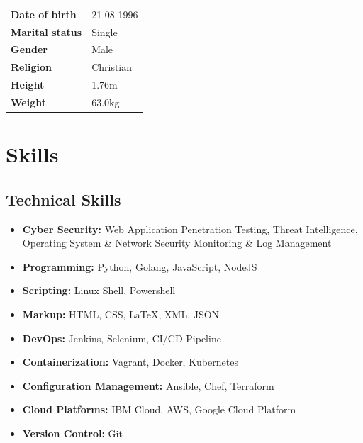 \documentclass[11pt,a4paper]{moderncv}
\begin{document}
\begin{tabular}{p{4cm}l}
\textbf{Date of birth}         &   21-08-1996 \\ 
\textbf{Marital status}        &   Single    \\ 
\textbf{Gender}                &   Male \\
\textbf{Religion}             &    Christian\\
\textbf{Height}     &    1.76m \\ 
\textbf{Weight}     &    63.0kg \\ 

\end{tabular}

\section{Skills}

\subsection{\textbf{Technical Skills}}

\begin{itemize}
	
	\item \textbf{Cyber Security:} Web Application Penetration Testing, Threat Intelligence, Operating System \& Network Security Monitoring \& Log Management
	
	\item \textbf{Programming:} Python, Golang, JavaScript, NodeJS
	
	\item \textbf{Scripting:} Linux Shell, Powershell
	
	\item \textbf{Markup:} HTML, CSS, {\LaTeX}, XML, JSON
	
	\item \textbf{DevOps:} Jenkins, Selenium, CI/CD Pipeline
	
	\item \textbf{Containerization:} Vagrant, Docker, Kubernetes
	
	\item \textbf{Configuration Management:} Ansible, Chef, Terraform

	\item \textbf{Cloud Platforms:} IBM Cloud, AWS, Google Cloud Platform

	\item \textbf{Version Control:} Git

\end{itemize}
	
\end{document}

